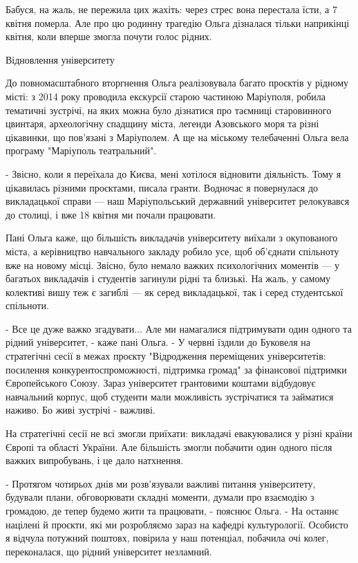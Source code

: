 Бабуся, на жаль, не пережила цих жахіть: через стрес вона перестала їсти, а 7
квітня померла. Але про цю родинну трагедію Ольга дізналася тільки наприкінці
квітня, коли вперше змогла почути голос рідних. 

Відновлення університету

До повномасштабного вторгнення Ольга реалізовувала багато проєктів у рідному
місті: з 2014 року проводила екскурсії старою частиною Маріуполя, робила
тематичні зустрічі, на яких можна було дізнатися про таємниці старовинного
цвинтаря, археологічну спадщину міста, легенди Азовського моря та різні
цікавинки, що пов'язані з Маріуполем. А ще на міському телебаченні Ольга вела
програму "Маріуполь театральний". 

- Звісно, коли я переїхала до Києва, мені хотілося відновити діяльність. Тому я
цікавилась різними проєктами, писала гранти. Водночас я повернулася до
викладацької справи — наш Маріупольський державний університет релокувався до
столиці, і вже 18 квітня ми почали працювати. 

Пані Ольга каже, що більшість викладачів університету виїхали з окупованого
міста, а керівництво навчального закладу робило усе, щоб об'єднати спільноту
вже на новому місці. Звісно, було немало важких психологічних моментів  — у
багатьох викладачів і студентів загинули рідні та близькі. На жаль, у самому
колективі вишу теж є загиблі — як серед викладацької, так і серед студентської
спільноти. 

- Все це дуже важко згадувати... Але ми намагалися підтримувати один одного та
рідний університет, - каже пані Ольга. - У червні їздили до Буковеля на
стратегічні сесії в межах проєкту "Відродження переміщених університетів:
посилення конкурентоспроможності, підтримка громад" за фінансової підтримки
Європейського Союзу.  Зараз університет грантовими коштами відбудовує
навчальний корпус, щоб студенти мали можливість зустрічатися та займатися
наживо. Бо живі зустрічі - важливі.

На стратегічні сесії не всі змогли приїхати: викладачі евакуювалися у різні
країни Європі та області України. Але більшість змогли побачити один одного
після важких випробувань, і це дало натхнення. 

- Протягом чотирьох днів ми розв'язували важливі питання університету, будували
плани, обговорювати складні моменти, думали про взаємодію з громадою, де тепер
будемо жити та працювати, - пояснює Ольга. -  На останнє націлені й проєкти,
які ми розробляємо зараз на кафедрі культурології. Особисто я відчула потужний
поштовх, повірила у наш потенціал, побачила очі колег, переконалася, що рідний
університет незламний.

